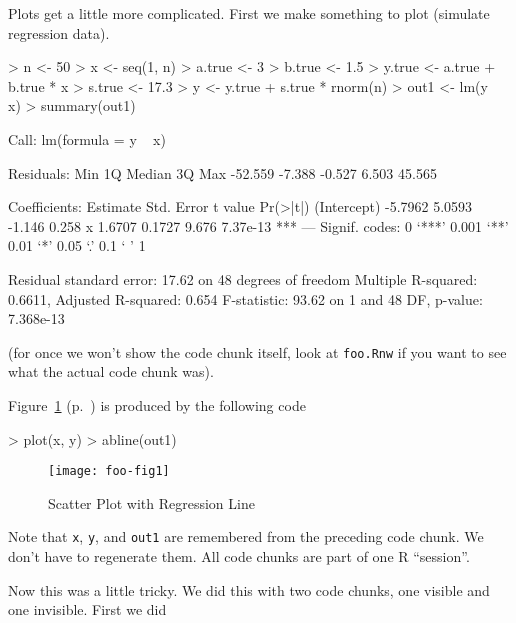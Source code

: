 \documentclass{article}
\begin{document}
\pagebreak[3]
Plots get a little more complicated.  First we make something to plot
(simulate regression data).

\begin{Schunk}
\begin{Sinput}
> n <- 50
> x <- seq(1, n)
> a.true <- 3
> b.true <- 1.5
> y.true <- a.true + b.true * x
> s.true <- 17.3
> y <- y.true + s.true * rnorm(n)
> out1 <- lm(y ~ x)
> summary(out1)
\end{Sinput}
\begin{Soutput}
Call:
lm(formula = y ~ x)

Residuals:
    Min      1Q  Median      3Q     Max 
-52.559  -7.388  -0.527   6.503  45.565 

Coefficients:
            Estimate Std. Error t value Pr(>|t|)    
(Intercept)  -5.7962     5.0593  -1.146    0.258    
x             1.6707     0.1727   9.676 7.37e-13 ***
---
Signif. codes:  0 ‘***’ 0.001 ‘**’ 0.01 ‘*’ 0.05 ‘.’ 0.1 ‘ ’ 1 

Residual standard error: 17.62 on 48 degrees of freedom
Multiple R-squared: 0.6611,	Adjusted R-squared: 0.654 
F-statistic: 93.62 on 1 and 48 DF,  p-value: 7.368e-13 
\end{Soutput}
\end{Schunk}

(for once we won't show the code chunk itself, look at \texttt{foo.Rnw}
if you want to see what the actual code chunk was).

Figure~\ref{fig:one} (p.~\pageref{fig:one})
is produced by the following code

\begin{Schunk}
\begin{Sinput}
> plot(x, y)
> abline(out1)
\end{Sinput}
\end{Schunk}

\begin{figure}
\begin{center}
\texttt{[image: foo-fig1]}
\end{center}
\caption{Scatter Plot with Regression Line}
\label{fig:one}
\end{figure}

Note that \texttt{x}, \texttt{y}, and \texttt{out1} are remembered from
the preceding code chunk.  We don't have to regenerate them.
All code chunks are part of one R ``session''.

Now this was a little tricky.  We did this with two code chunks,
one visible and one invisible.  First we did
\end{document}
